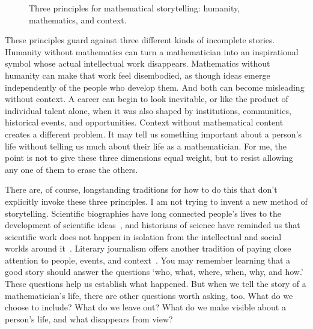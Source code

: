 \documentclass[pdflatex,sn-mathphys-num]{sn-jnl}%
\begin{document}
\begin{figure}[htpb]
\begin{center}
\end{center}
\caption{Three principles for mathematical storytelling: humanity, mathematics, and context.}
\label{fig:storytelling_principles}
\end{figure}

These principles guard against three different kinds of incomplete stories. Humanity without mathematics can turn a mathematician into an inspirational symbol whose actual intellectual work disappears. Mathematics without humanity can make that work feel disembodied, as though ideas emerge independently of the people who develop them. And both can become misleading without context. A career can begin to look inevitable, or like the product of individual talent alone, when it was also shaped by institutions, communities, historical events, and opportunities. Context without mathematical content creates a different problem. It may tell us something important about a person's life without telling us much about their life as a mathematician. For me, the point is not to give these three dimensions equal weight, but to resist allowing any one of them to erase the others.

 There are, of course, longstanding traditions for how to do this that don't explicitly invoke these three principles. I am not trying to invent a new method of storytelling. Scientific biographies have long connected people's lives to the development of scientific ideas~\cite{soderqvist2007history}, and historians of science have reminded us that scientific work does not happen in isolation from the intellectual and social worlds around it~\cite{shapin1994social}. Literary journalism offers another tradition of paying close attention to people, events, and context~\cite{kramer1995literary}. You may remember learning that a good story should answer the questions `who, what, where, when, why, and how.' These questions help us establish what happened. But when we tell the story of a mathematician's life, there are other questions worth asking, too.
 What do we choose to include? What do we leave out? What do we make visible about a person's life, and what disappears from view?
\end{document}

